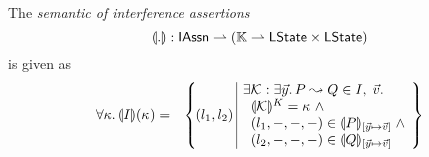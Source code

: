 %
%
\begin{definition}
The \emph{semantic of interference assertions}
%
\[
	\llparenthesis . \rrparenthesis : \textsf{IAssn} \rightharpoonup \left(\mathbb{K} \rightharpoonup  \textsf{LState} \times \textsf{LState} \right)
\]
%
is given as
%
\[
\begin{array}{r l}
	\for{\kappa} \intermediateSemI{I}(\ca{}) =
	 	&
	 	\left\{
		\begin{array}{l | r}
			
			\hspace*{-0.2cm}(l_1, l_2)\hspace*{-0.1cm} & 
			\hspace*{-0.2cm}
			\begin{array}{l}
				\exsts{\interAss{\capAss{}}{\vec{y}}{P}{Q} \in I,\; \vec{v}}\\
	
				\hspace*{0.2cm}
				\semK[]{\capAss{}} = \ca{} \; \land\\
				
				\hspace*{0.2cm}
				(l_1, -, -, -) \in \intermediateSem[\text{[} \vec{y} \mapsto \vec{v} \text{]}]{P} \;\land\\
				

				
				\hspace*{0.2cm}
				(l_2, -, -, -) \in \intermediateSem[\text{[} \vec{y} \mapsto \vec{v} \text{]}]{Q} 
				
			\end{array}
		\end{array}
	\hspace*{-0.2cm}
	\right\}\\\\
	

	
\end{array}
\]
%
\end{definition}
%
%
